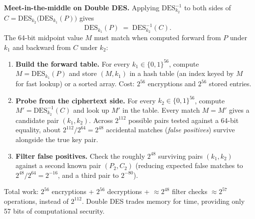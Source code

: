 \begin{attackbox}
\textbf{Meet-in-the-middle on Double DES.} Applying $\mathrm{DES}_{k_2}^{-1}$ to both sides of $C = \mathrm{DES}_{k_2}\!\bigl(\mathrm{DES}_{k_1}(P)\bigr)$ gives
\[
\mathrm{DES}_{k_1}(P) \;=\; \mathrm{DES}_{k_2}^{-1}(C).
\]
The 64-bit midpoint value $M$ must match when computed forward from $P$ under $k_1$ and backward from $C$ under $k_2$:
\begin{enumerate}
  \item \textbf{Build the forward table.} For every $k_1 \in \{0,1\}^{56}$, compute $M = \mathrm{DES}_{k_1}(P)$ and store $(M, k_1)$ in a hash table (an index keyed by $M$ for fast lookup) or a sorted array. Cost: $2^{56}$ encryptions and $2^{56}$ stored entries.
  \item \textbf{Probe from the ciphertext side.} For every $k_2 \in \{0,1\}^{56}$, compute $M' = \mathrm{DES}_{k_2}^{-1}(C)$ and look up $M'$ in the table. Every match $M = M'$ gives a candidate pair $(k_1, k_2)$. Across $2^{112}$ possible pairs tested against a 64-bit equality, about $2^{112}/2^{64} = 2^{48}$ accidental matches (\emph{false positives}) survive alongside the true key pair.
  \item \textbf{Filter false positives.} Check the roughly $2^{48}$ surviving pairs $(k_1, k_2)$ against a second known pair $(P_2, C_2)$ (reducing expected false matches to $2^{48}/2^{64} = 2^{-16}$, and a third pair to $2^{-80}$).
\end{enumerate}
Total work: $2^{56}$ encryptions + $2^{56}$ decryptions + $\approx 2^{48}$ filter checks $\approx 2^{57}$ operations, instead of $2^{112}$. Double DES trades memory for time, providing only 57 bits of computational security.
\end{attackbox}

